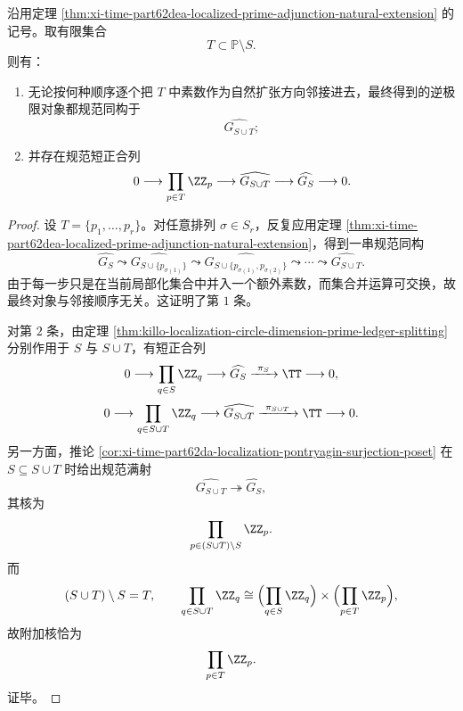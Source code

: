 \begin{corollary}\label{cor:xi-time-part62dea-prime-adjunction-order-independent-kernel-product}
沿用定理 \ref{thm:xi-time-part62dea-localized-prime-adjunction-natural-extension} 的记号。取有限集合
\[
T\subset \mathbb P\setminus S.
\]
则有：
\begin{enumerate}
  \item 无论按何种顺序逐个把 \(T\) 中素数作为自然扩张方向邻接进去，最终得到的逆极限对象都规范同构于
  \[
  \widehat{G_{S\cup T}};
  \]
  \item 并存在规范短正合列
  \[
  0\longrightarrow \prod_{p\in T}\ZZ_p
  \longrightarrow \widehat{G_{S\cup T}}
  \longrightarrow \widehat{G_S}
  \longrightarrow 0.
  \]
\end{enumerate}
\end{corollary}
\begin{proof}
设 \(T=\{p_1,\dots,p_r\}\)。对任意排列 \(\sigma\in S_r\)，反复应用定理 \ref{thm:xi-time-part62dea-localized-prime-adjunction-natural-extension}，得到一串规范同构
\[
\widehat{G_S}
\leadsto
\widehat{G_{S\cup\{p_{\sigma(1)}\}}}
\leadsto
\widehat{G_{S\cup\{p_{\sigma(1)},p_{\sigma(2)}\}}}
\leadsto \cdots \leadsto
\widehat{G_{S\cup T}}.
\]
由于每一步只是在当前局部化集合中并入一个额外素数，而集合并运算可交换，故最终对象与邻接顺序无关。这证明了第 \(1\) 条。

对第 \(2\) 条，由定理 \ref{thm:killo-localization-circle-dimension-prime-ledger-splitting} 分别作用于 \(S\) 与 \(S\cup T\)，有短正合列
\[
0\longrightarrow \prod_{q\in S}\ZZ_q
\longrightarrow \widehat{G_S}
\xrightarrow{\ \pi_S\ }
\TT
\longrightarrow 0,
\]
\[
0\longrightarrow \prod_{q\in S\cup T}\ZZ_q
\longrightarrow \widehat{G_{S\cup T}}
\xrightarrow{\ \pi_{S\cup T}\ }
\TT
\longrightarrow 0.
\]
另一方面，推论 \ref{cor:xi-time-part62da-localization-pontryagin-surjection-poset} 在 \(S\subseteq S\cup T\) 时给出规范满射
\[
\widehat{G_{S\cup T}}\twoheadrightarrow \widehat{G_S},
\]
其核为
\[
\prod_{p\in (S\cup T)\setminus S}\ZZ_p.
\]
而
\[
(S\cup T)\setminus S=T,
\qquad
\prod_{q\in S\cup T}\ZZ_q
\cong
\Bigl(\prod_{q\in S}\ZZ_q\Bigr)\times
\Bigl(\prod_{p\in T}\ZZ_p\Bigr),
\]
故附加核恰为
\[
\prod_{p\in T}\ZZ_p.
\]
证毕。
\end{proof}

